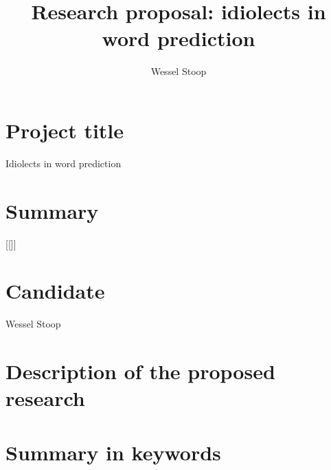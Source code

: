 \documentclass[12pt]{article}
\title{Research proposal: idiolects in word prediction}
\author{Wessel Stoop}
\begin{document}
\section{Project title}
Idiolects in word prediction
\section{Summary}
[[]]
\section{Candidate}
Wessel Stoop
\section{Description of the proposed research}

\section{Summary in keywords}
\end{document}
